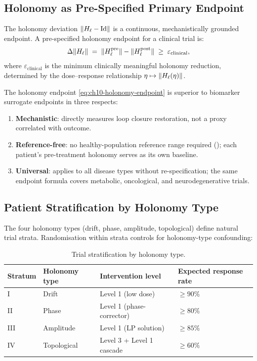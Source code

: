 \subsection{Holonomy as Pre-Specified Primary Endpoint}

The holonomy deviation $\|H_\ell - \mathrm{Id}\|$ is a continuous, mechanistically
grounded endpoint.  A pre-specified holonomy endpoint for a clinical trial is:
\begin{equation}
  \Delta\|H_\ell\| \;=\; \|H_\ell^{\mathrm{pre}}\| - \|H_\ell^{\mathrm{post}}\|
  \;\geq\; \varepsilon_{\mathrm{clinical}},
  \label{eq:ch10-holonomy-endpoint}
\end{equation}
where $\varepsilon_{\mathrm{clinical}}$ is the minimum clinically meaningful
holonomy reduction, determined by the dose--response relationship
$\eta \mapsto \|H_\ell(\eta)\|$.

\begin{proposition}
\label{prop:ch10-holonomy-endpoint}
The holonomy endpoint \eqref{eq:ch10-holonomy-endpoint} is superior to
biomarker surrogate endpoints in three respects:
\begin{enumerate}[label=(\roman*), leftmargin=2em]
  \item \textbf{Mechanistic}: directly measures loop closure restoration,
    not a proxy correlated with outcome.
  \item \textbf{Reference-free}: no healthy-population reference range
    required (); each patient's pre-treatment
    holonomy serves as its own baseline.
  \item \textbf{Universal}: applies to all disease types without
    re-specification; the same endpoint formula covers metabolic,
    oncological, and neurodegenerative trials.
\end{enumerate}
\end{proposition}

\subsection{Patient Stratification by Holonomy Type}

The four holonomy types (drift, phase, amplitude, topological) define
natural trial strata.  Randomisation within strata controls for
holonomy-type confounding:

\begin{table}[!htbp]
\centering
\caption{Trial stratification by holonomy type.}
\label{tab:ch10-strata}
\begin{tabular}{@{}llll@{}}
\toprule
Stratum & Holonomy type & Intervention level & Expected response rate \\
\midrule
I   & Drift      & Level 1 (low dose) & $\geq 90\%$ \\
II  & Phase      & Level 1 (phase-corrector) & $\geq 80\%$ \\
III & Amplitude  & Level 1 (LP solution) & $\geq 85\%$ \\
IV  & Topological & Level 3 + Level 1 cascade & $\geq 60\%$ \\
\bottomrule
\end{tabular}
\end{table}


